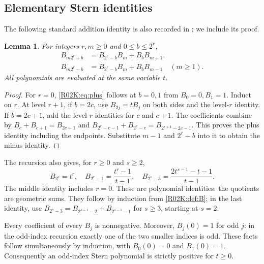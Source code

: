 \documentclass[11pt,a4paper]{article}
\newtheorem{SourceRacKlemma}[SourceRacKtheorem]{Lemma}
\begin{document}
\subsection{Elementary Stern identities}
The following standard addition identity is also recorded in
\cite[Lemma 2.1]{R02K:Ulas}; we include its proof.
\begin{SourceRacKlemma}\label{R02K:lem:add}
For integers $r,m\ge0$ and $0\le b\le2^r$,
\begin{align}
 B_{m2^r+b}&=B_{2^r-b}B_m+B_bB_{m+1},\label{R02K:eq:plus}\\
 B_{m2^r-b}&=B_{2^r-b}B_m+B_bB_{m-1}\quad(m\ge1).\label{R02K:eq:minus}
\end{align}
All polynomials are evaluated at the same variable $t$.
\end{SourceRacKlemma}
\begin{proof}
For $r=0$, \eqref{R02K:eq:plus} follows at $b=0,1$ from $B_0=0,B_1=1$.
Induct on $r$. At level $r+1$, if $b=2c$, use $B_{2j}=tB_j$ on both
sides and the level-$r$ identity. If $b=2c+1$, add the level-$r$
identities for $c$ and $c+1$. The coefficients combine by
$B_c+B_{c+1}=B_{2c+1}$ and
$B_{2^r-c-1}+B_{2^r-c}=B_{2^{r+1}-2c-1}$. This proves the plus identity
including the endpoints. Substitute $m-1$ and $2^r-b$ into it to obtain
the minus identity.
\end{proof}
The recursion also gives, for $r\ge0$ and $s\ge2$,
\begin{equation}\label{R02K:eq:geometric}
 B_{2^r}=t^r,\quad B_{2^r-1}=\frac{t^r-1}{t-1},\quad
 B_{2^s-3}=\frac{2t^{s-1}-t-1}{t-1}.
\end{equation}
The middle identity includes $r=0$. These are polynomial identities:
the quotients are geometric sums. They follow by induction from
\eqref{R02K:def:B}; in the last identity, use
$B_{2^s-3}=B_{2^{s-1}-2}+B_{2^{s-1}-1}$ for $s\ge3$, starting at $s=2$.

Every coefficient of every $B_j$ is nonnegative. Moreover, $B_j(0)=1$
for odd $j$: in the odd-index recursion exactly one of the two smaller
indices is odd. These facts follow simultaneously by induction, with
$B_0(0)=0$ and $B_1(0)=1$. Consequently an odd-index Stern polynomial
is strictly positive for $t\ge0$.
\end{document}
